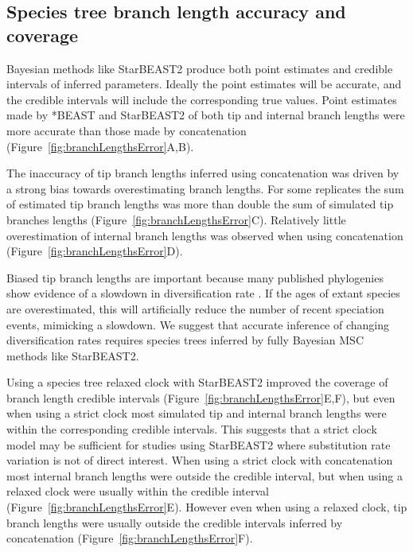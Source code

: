 \documentclass[12pt]{article}
\begin{document}
\subsection{Species tree branch length accuracy and coverage}

Bayesian methods like StarBEAST2 produce both point estimates and credible
intervals of inferred parameters. Ideally the point estimates will be
accurate, and the credible intervals will include the corresponding true
values. Point estimates made by *BEAST and StarBEAST2 of both tip and internal
branch lengths were more accurate than those made by concatenation
(Figure~\ref{fig:branchLengthsError}A,B).

The inaccuracy of tip branch lengths inferred using concatenation was driven
by a strong bias towards overestimating branch lengths. For some replicates
the sum of estimated tip branch lengths was more than double the sum of
simulated tip branches lengths (Figure~\ref{fig:branchLengthsError}C).
Relatively little overestimation of internal branch lengths was observed when
using concatenation (Figure~\ref{fig:branchLengthsError}D).

Biased tip branch lengths are important because many published phylogenies show
evidence of a slowdown in diversification rate \citep{Moen2014190}. If the
ages of extant species are overestimated, this will artificially reduce the
number of recent speciation events, mimicking a slowdown. We suggest that
accurate inference of changing diversification rates requires species trees
inferred by fully Bayesian MSC methods like StarBEAST2.

Using a species tree relaxed clock with StarBEAST2 improved the coverage of branch
length credible intervals (Figure~\ref{fig:branchLengthsError}E,F), but even
when using a strict clock most simulated tip and internal branch lengths were
within the corresponding credible intervals. This suggests that a strict clock
model may be sufficient for studies using StarBEAST2 where substitution rate
variation is not of direct interest. When using a strict clock with
concatenation most internal branch lengths were outside the credible interval,
but when using a relaxed clock were usually within the credible interval
(Figure~\ref{fig:branchLengthsError}E). However even when using a relaxed
clock, tip branch lengths were usually outside the credible intervals inferred
by concatenation (Figure~\ref{fig:branchLengthsError}F).
\end{document}
